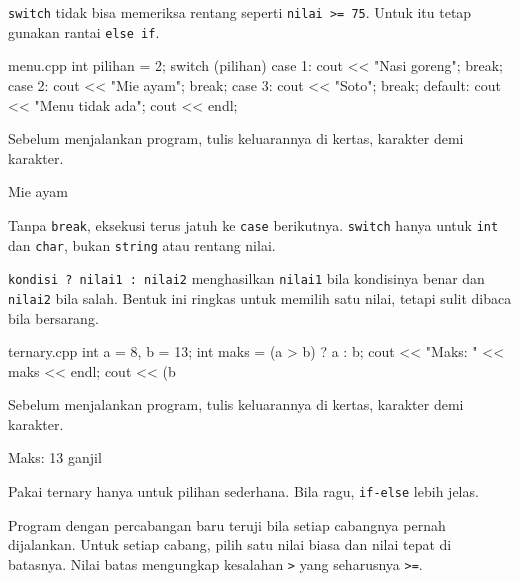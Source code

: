 \documentclass[a4paper]{article}
\begin{document}
\texttt{switch} tidak bisa memeriksa rentang seperti \texttt{nilai >= 75}. Untuk itu tetap gunakan rantai \texttt{else if}.

\begin{MKode}{menu.cpp}
int pilihan = 2;
switch (pilihan) {
    case 1: cout << "Nasi goreng"; break;
    case 2: cout << "Mie ayam"; break;
    case 3: cout << "Soto"; break;
    default: cout << "Menu tidak ada";
}
cout << endl;
\end{MKode}
\begin{Tebak}[]
Sebelum menjalankan program, tulis keluarannya di kertas, karakter demi karakter.
\end{Tebak}
\begin{Jawaban}[]
\begin{MKeluaran}[]
Mie ayam
\end{MKeluaran}
Tanpa \texttt{break}, eksekusi terus jatuh ke \texttt{case} berikutnya. \texttt{switch} hanya untuk \texttt{int} dan \texttt{char}, bukan \texttt{string} atau rentang nilai.
\end{Jawaban}
\texttt{kondisi ? nilai1 : nilai2} menghasilkan \texttt{nilai1} bila kondisinya benar dan \texttt{nilai2} bila salah. Bentuk ini ringkas untuk memilih satu nilai, tetapi sulit dibaca bila bersarang.

\begin{MKode}{ternary.cpp}
int a = 8, b = 13;
int maks = (a > b) ? a : b;
cout << "Maks: " << maks << endl;
cout << (b %
\end{MKode}
\begin{Tebak}[]
Sebelum menjalankan program, tulis keluarannya di kertas, karakter demi karakter.
\end{Tebak}
\begin{Jawaban}[]
\begin{MKeluaran}[]
Maks: 13
ganjil
\end{MKeluaran}
Pakai ternary hanya untuk pilihan sederhana. Bila ragu, \texttt{if-else} lebih jelas.
\end{Jawaban}
Program dengan percabangan baru teruji bila setiap cabangnya pernah dijalankan. Untuk setiap cabang, pilih satu nilai biasa dan nilai tepat di batasnya. Nilai batas mengungkap kesalahan \texttt{>} yang seharusnya \texttt{>=}.
\end{document}
